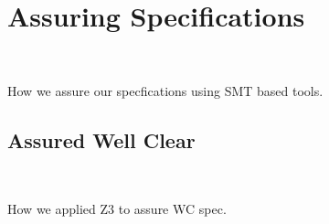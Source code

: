 \section{Assuring Specifications}~\label{sec:specverify}

How we assure our specfications using SMT based tools. 


\subsection{Assured Well Clear}~\label{sec:verifiywc} 

How we applied Z3 to assure WC spec.


